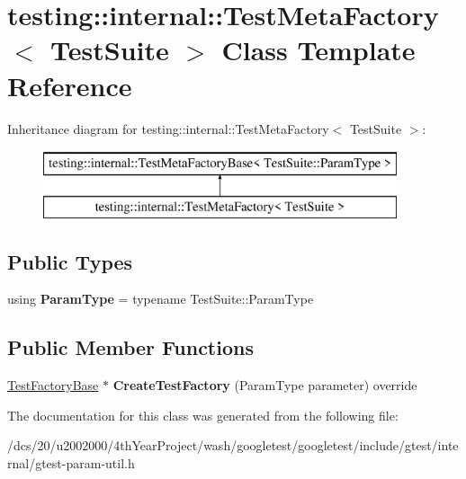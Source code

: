 \hypertarget{classtesting_1_1internal_1_1TestMetaFactory}{}\section{testing\+:\+:internal\+:\+:Test\+Meta\+Factory$<$ Test\+Suite $>$ Class Template Reference}
\label{classtesting_1_1internal_1_1TestMetaFactory}
Inheritance diagram for testing\+:\+:internal\+:\+:Test\+Meta\+Factory$<$ Test\+Suite $>$\+:\begin{figure}[H]
\begin{center}
\leavevmode
\includegraphics[height=2.000000cm]{classtesting_1_1internal_1_1TestMetaFactory}
\end{center}
\end{figure}
\subsection*{Public Types}
\begin{DoxyCompactItemize}
\item 
\mbox{\label{classtesting_1_1internal_1_1TestMetaFactory_a392ebab15dfdcfa1b54bbe15878aa9cd}} 
using {\bfseries Param\+Type} = typename Test\+Suite\+::\+Param\+Type
\end{DoxyCompactItemize}
\subsection*{Public Member Functions}
\begin{DoxyCompactItemize}
\item 
\mbox{\label{classtesting_1_1internal_1_1TestMetaFactory_abd5d30fab71229deb5e63f5bb5ea3fd8}} 
\mbox{\hyperlink{classtesting_1_1internal_1_1TestFactoryBase}{Test\+Factory\+Base}} $\ast$ {\bfseries Create\+Test\+Factory} (Param\+Type parameter) override
\end{DoxyCompactItemize}


The documentation for this class was generated from the following file\+:\begin{DoxyCompactItemize}
\item 
/dcs/20/u2002000/4th\+Year\+Project/wash/googletest/googletest/include/gtest/internal/gtest-\/param-\/util.\+h\end{DoxyCompactItemize}
